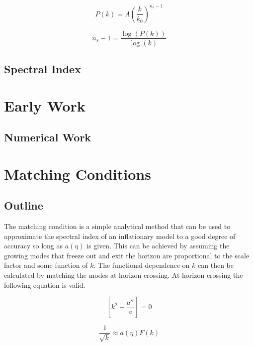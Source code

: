 \documentclass[12pt]{article} %
\begin{document}
\begin{equation}\label{powerspec}
P(k)=A \left(\frac{k}{k_{0}}\right)^{n_{s}-1}
\end{equation}

\begin{equation}\label{logpowerspec}
n_{s}-1 = \frac{\log (P(k))}{\log(k)}
\end{equation}

\subsection{Spectral Index}

\section{Early Work}

\subsection{Numerical Work}

\section{Matching Conditions}

\subsection{Outline}

The matching condition is a simple analytical method that can be used to approximate the spectral index of an inflationary model to a good degree of accuracy so long as $a(\eta)$ is given. This can be achieved by assuming the growing modes that freeze out and exit the horizon are proportional to the scale factor and some function of $k$. The functional dependence on $k$ can then be calculated by matching the modes at horizon crossing. At horizon crossing the following equation is valid.

\begin{equation}\label{matchingcondition}
\left[ k^{2} - \frac{a''}{a} \right] = 0
\end{equation}

\begin{equation}\label{matchingequation}
\frac{1}{\sqrt{k}} \approx a(\eta)F(k)
\end{equation}
\end{document}
